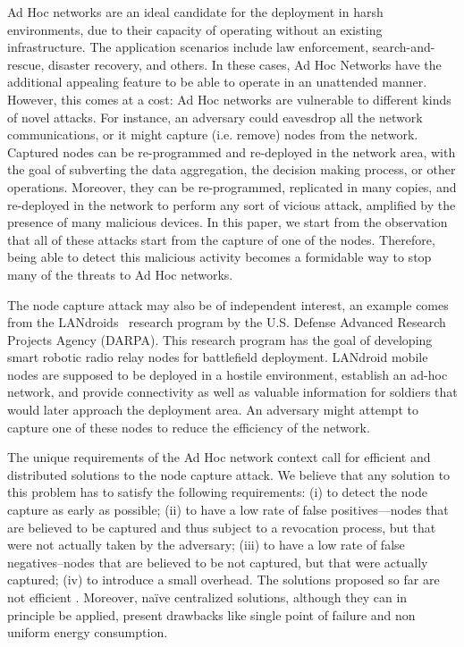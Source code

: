 \documentclass{IEEEconf}
\begin{document}
Ad Hoc networks are an ideal candidate for the deployment in harsh environments,
due to their capacity of operating without an existing infrastructure. The application
scenarios include law enforcement, search-and-rescue, disaster recovery, and others.
In these cases, Ad Hoc Networks have the additional appealing feature to be able to operate in
an unattended manner. However, this comes at a cost: Ad Hoc networks are vulnerable to different kinds of novel attacks. For instance, an adversary could eavesdrop all the network communications, or it might capture (i.e. remove) nodes from the network.
Captured nodes can be re-programmed and re-deployed in the network area, with the goal of subverting the data aggregation, the decision making process, or other operations.
Moreover, they can be re-programmed, replicated in many copies, and re-deployed
in the network to perform any sort of vicious attack, amplified by the presence of many
malicious devices. In this paper, we start from the observation that all of these
attacks start from the capture of one of the nodes. Therefore, being able to detect
this malicious activity becomes a formidable way to stop many of the threats to
Ad Hoc networks.

The node capture attack may also be of independent interest, an example comes
from the LANdroids~\cite{landroid} research program by the  U.S. Defense Advanced Research
Projects Agency (DARPA). This research program has the goal of developing
smart robotic radio relay nodes for battlefield deployment. LANdroid mobile nodes are supposed
to be deployed in a hostile environment, establish an ad-hoc network, and provide connectivity
as well as valuable information for soldiers that would later approach the deployment area.
An adversary might attempt to capture one of these nodes to reduce the efficiency of
the network.

The unique requirements of the Ad Hoc network context call for efficient and distributed solutions to the node capture attack.
We believe that any solution to this problem has to satisfy the following requirements:
(i) to detect the node capture as early as possible; (ii) to have a low rate of false positives---nodes that are believed to be captured and thus subject to a revocation process, but that were not actually taken by the adversary; (iii) to have a low rate of false negatives--nodes that are believed to be not captured, but that were actually captured; (iv) to introduce a small overhead.
The solutions proposed so far are not efficient \cite{PSW:SecurityWSN:CommunicationACM}. Moreover, na\"{i}ve centralized solutions, although they can in principle be applied, present drawbacks like single point of failure and non uniform energy consumption.
\end{document}
